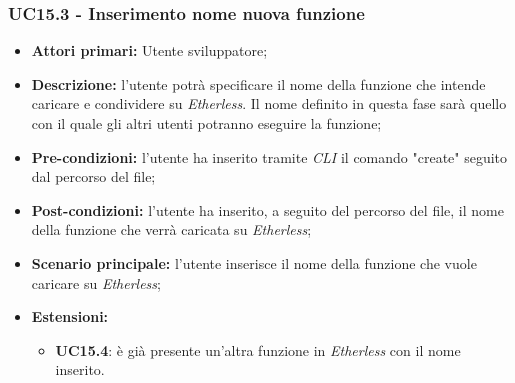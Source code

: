 \subsubsection{UC15.3 - Inserimento nome nuova funzione}
\begin{itemize}
	\item \textbf{Attori primari:} Utente sviluppatore;
	\item \textbf{Descrizione:} l'utente potrà specificare il nome della funzione che intende caricare e condividere su \textit{Etherless}. Il nome definito in questa fase sarà quello con il quale gli altri utenti potranno eseguire la funzione; 
	\item \textbf{Pre-condizioni:} l'utente ha inserito tramite \textit{CLI\glo} il comando "create" seguito dal percorso del file;
	\item \textbf{Post-condizioni:} l'utente ha inserito, a seguito del percorso del file, il nome della funzione che verrà caricata su \textit{Etherless};
	\item \textbf{Scenario principale:} l'utente inserisce il nome della funzione che vuole caricare su \textit{Etherless};
	\item \textbf{Estensioni:} 
	\begin{itemize}
		\item \textbf{UC15.4}: è già presente un'altra funzione in \textit{Etherless} con il nome inserito.
	\end{itemize}
\end{itemize}